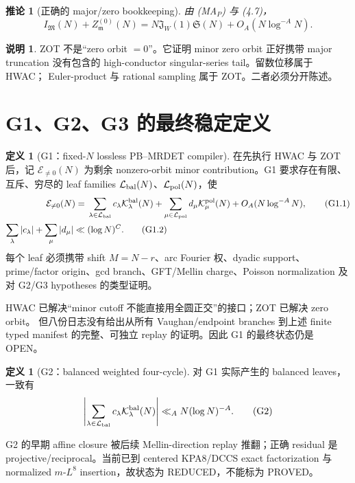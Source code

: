 \documentclass[11pt,a4paper]{ctexart}
\newtheorem{corollary}[theorem]{推论}
\theoremstyle{definition}
\newtheorem{definition}[theorem]{定义}
\newtheorem{remark}[theorem]{说明}
\newcommand{\1}{\mathbf 1}
\newcommand{\E}{\mathcal E}
\newcommand{\K}{\mathcal K}
\newcommand{\LL}{\mathcal L}
\newcommand{\OPEN}{\textcolor{red!70!black}{\textsf{OPEN}}}
\newcommand{\REDUCED}{\textcolor{orange!80!black}{\textsf{REDUCED}}}
\begin{document}
\begin{corollary}[正确的 major/zero bookkeeping]
由 \textup{(MA$_P$)} 与 (4.7)，
\[
I_{\mathfrak M}(N)+Z_{\mathfrak m}^{(0)}(N)
=N\mathfrak J_W(1)\mathfrak S(N)+O_A(N\log^{-A}N).     \tag{4.11}
\]
\end{corollary}

\begin{remark}
ZOT 不是“zero orbit $=0$”。它证明 minor zero orbit 正好携带 major truncation
没有包含的 high-conductor singular-series tail。留数位移属于 HWAC；
Euler-product 与 rational sampling 属于 ZOT。二者必须分开陈述。
\end{remark}

\section{G1、G2、G3 的最终稳定定义}

\begin{definition}[G1：fixed-$N$ lossless PB--MRDET compiler]
在先执行 HWAC 与 ZOT 后，记 $\E_{\ne0}(N)$ 为剩余 nonzero-orbit minor
contribution。G1 要求存在有限、互斥、穷尽的 leaf families
$\LL_{\rm bal}(N)$、$\LL_{\rm pol}(N)$，使
\begin{align}
\E_{\ne0}(N)
={}&\sum_{\lambda\in\LL_{\rm bal}}c_\lambda
\K_\lambda^{\rm bal}(N)
+\sum_{\mu\in\LL_{\rm pol}}d_\mu
\K_\mu^{\rm pol}(N)+O_A(N\log^{-A}N),                 \tag{G1.1}\\
\sum_\lambda|c_\lambda|+
\sum_\mu|d_\mu|\ll{}&(\log N)^C.                      \tag{G1.2}
\end{align}
每个 leaf 必须携带 shift $M=N-r$、arc Fourier 权、dyadic support、
prime/factor origin、gcd branch、GFT/Mellin charge、Poisson normalization
及对 G2/G3 hypotheses 的类型证明。
\end{definition}

HWAC 已解决“minor cutoff 不能直接用全圆正交”的接口；ZOT 已解决 zero orbit。
但八份日志没有给出从所有 Vaughan/endpoint branches 到上述 finite typed manifest
的完整、可独立 replay 的证明。因此 G1 的最终状态仍是 \OPEN。

\begin{definition}[G2：balanced weighted four-cycle]
对 G1 实际产生的 balanced leaves，一致有
\[
\left|\sum_{\lambda\in\LL_{\rm bal}}c_\lambda
\K_\lambda^{\rm bal}(N)\right|
\ll_A N(\log N)^{-A}.                                  \tag{G2}
\]
\end{definition}

G2 的早期 affine closure 被后续 Mellin-direction replay 推翻；正确 residual 是
projective/reciprocal。当前已到 centered KPA8/DCCS exact factorization 与
normalized $m$-$L^8$ insertion，故状态为 \REDUCED，不能标为 PROVED。
\end{document}
